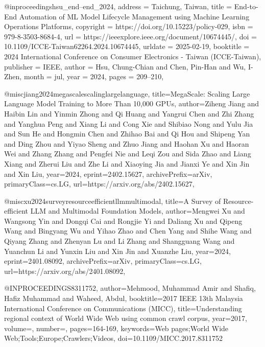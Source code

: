 @inproceedings{hsu_end--end_2024,
	address = {Taichung, Taiwan},
	title = {End-to-{End} {Automation} of {ML} {Model} {Lifecycle} {Management} using {Machine} {Learning} {Operations} {Platforms}},
	copyright = {https://doi.org/10.15223/policy-029},
	isbn = {979-8-3503-8684-4},
	url = {https://ieeexplore.ieee.org/document/10674445/},
	doi = {10.1109/ICCE-Taiwan62264.2024.10674445},
	urldate = {2025-02-19},
	booktitle = {2024 {International} {Conference} on {Consumer} {Electronics} - {Taiwan} ({ICCE}-{Taiwan})},
	publisher = {IEEE},
	author = {Hsu, Chung-Chian and Chen, Pin-Han and Wu, I-Zhen},
	month = jul,
	year = {2024},
	pages = {209--210},
}


@misc{jiang2024megascalescalinglargelanguage,
      title={MegaScale: Scaling Large Language Model Training to More Than 10,000 GPUs}, 
      author={Ziheng Jiang and Haibin Lin and Yinmin Zhong and Qi Huang and Yangrui Chen and Zhi Zhang and Yanghua Peng and Xiang Li and Cong Xie and Shibiao Nong and Yulu Jia and Sun He and Hongmin Chen and Zhihao Bai and Qi Hou and Shipeng Yan and Ding Zhou and Yiyao Sheng and Zhuo Jiang and Haohan Xu and Haoran Wei and Zhang Zhang and Pengfei Nie and Leqi Zou and Sida Zhao and Liang Xiang and Zherui Liu and Zhe Li and Xiaoying Jia and Jianxi Ye and Xin Jin and Xin Liu},
      year={2024},
      eprint={2402.15627},
      archivePrefix={arXiv},
      primaryClass={cs.LG},
      url={https://arxiv.org/abs/2402.15627}, 
}

@misc{xu2024surveyresourceefficientllmmultimodal,
      title={A Survey of Resource-efficient LLM and Multimodal Foundation Models}, 
      author={Mengwei Xu and Wangsong Yin and Dongqi Cai and Rongjie Yi and Daliang Xu and Qipeng Wang and Bingyang Wu and Yihao Zhao and Chen Yang and Shihe Wang and Qiyang Zhang and Zhenyan Lu and Li Zhang and Shangguang Wang and Yuanchun Li and Yunxin Liu and Xin Jin and Xuanzhe Liu},
      year={2024},
      eprint={2401.08092},
      archivePrefix={arXiv},
      primaryClass={cs.LG},
      url={https://arxiv.org/abs/2401.08092}, 
}

@INPROCEEDINGS{8311752,
  author={Mehmood, Muhammad Amir and Shafiq, Hafiz Muhammad and Waheed, Abdul},
  booktitle={2017 IEEE 13th Malaysia International Conference on Communications (MICC)}, 
  title={Understanding regional context of World Wide Web using common crawl corpus}, 
  year={2017},
  volume={},
  number={},
  pages={164-169},
  keywords={Web pages;World Wide Web;Tools;Europe;Crawlers;Videos},
  doi={10.1109/MICC.2017.8311752}}
